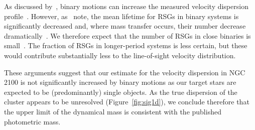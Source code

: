 \documentclass[useAMS,usenatbib]{mn2e}
\begin{document}
As discussed by~\citet{2010MNRAS.402.1750G}, binary motions can increase the measured velocity dispersion profile~\citep[e.g. see][]{2012A&A...546A..73H}.
However, as~\citet{2010MNRAS.402.1750G} note, the mean lifetime for RSGs in binary systems is significantly decreased and, where mass transfer occurs, their number decrease dramatically~\citep{2008MNRAS.384.1109E}. We therefore expect that the number of RSGs in close binaries is small~\citep{2009ApJ...696.2014D}. The fraction of RSGs in longer-period systems is less certain, but these would contribute substantially less to the line-of-sight velocity distribution.

These arguments suggest that our estimate for the velocity dispersion in NGC\,2100 is not significantly increased by binary motions as our target stars are expected to be (predominantly) single objects. As the true dispersion of the cluster appears to be unresolved (Figure~\ref{fig:sig1d}), we conclude therefore that the upper limit of the dynamical mass is consistent with the published photometric mass.



\end{document}
